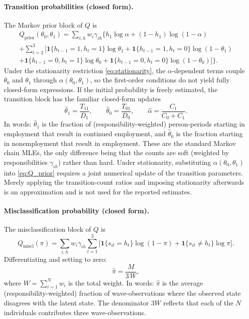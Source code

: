 \paragraph{Transition probabilities (closed form).}
The Markov prior block of \(Q\) is
\begin{multline}
Q_{\text{prior}}(\theta_0, \theta_1) =
\sum_{i, h} w_i \gamma_{ih} \bigg\{
  h_1 \log\alpha + (1 - h_1)\log(1 - \alpha) \\
  + \sum_{t=2}^{3} \Big[
    \mathbf{1}\{h_{t-1}{=}1, h_t{=}1\}\log\theta_1
    + \mathbf{1}\{h_{t-1}{=}1, h_t{=}0\}\log(1 - \theta_1) \\
    + \mathbf{1}\{h_{t-1}{=}0, h_t{=}1\}\log\theta_0
    + \mathbf{1}\{h_{t-1}{=}0, h_t{=}0\}\log(1 - \theta_0)
  \Big]
\bigg\}.
\label{eq:Q_prior}
\end{multline}
Under the stationarity restriction \eqref{eq:stationarity}, the
\(\alpha\)-dependent terms couple \(\theta_0\) and \(\theta_1\) through
\(\alpha(\theta_0, \theta_1)\), so the first-order conditions do not
yield fully closed-form expressions. If the initial probability is freely
estimated, the transition block has the familiar closed-form updates
\begin{equation}
\hat{\theta}_1 = \frac{T_{11}}{D_1}, \qquad
\hat{\theta}_0 = \frac{T_{01}}{D_0}, \qquad
\hat{\alpha} = \frac{C_1}{C_0+C_1}.
\label{eq:mstep_theta}
\end{equation}
In words: \(\hat{\theta}_1\) is the fraction of
(responsibility-weighted) person-periods starting in employment that
result in continued employment, and \(\hat{\theta}_0\) is the fraction
starting in nonemployment that result in employment. These are the
standard Markov chain MLEs, the only difference being that the counts
are soft (weighted by responsibilities \(\gamma_{ih}\)) rather than hard.
Under stationarity, substituting
\(\alpha(\theta_0,\theta_1)\) into \eqref{eq:Q_prior} requires a joint
numerical update of the transition parameters. Merely applying the
transition-count ratios and imposing stationarity afterwards is an
approximation and is not used for the reported estimates.

\paragraph{Misclassification probability (closed form).}
The misclassification block of \(Q\) is
\[
Q_{\text{miscl}}(\pi) = \sum_{i, h} w_i \gamma_{ih}
\sum_{t=1}^{3} \Big[
  \mathbf{1}\{s_{it} = h_t\}\log(1 - \pi)
  + \mathbf{1}\{s_{it} \neq h_t\}\log\pi
\Big].
\]
Differentiating and setting to zero:
\begin{equation}
\hat{\pi} = \frac{M}{3\,W},
\label{eq:mstep_pi}
\end{equation}
where \(W = \sum_{i=1}^{N} w_i\) is the total weight. In words:
\(\hat{\pi}\) is the average (responsibility-weighted) fraction of
wave-observations where the observed state disagrees with the latent
state. The denominator \(3W\) reflects that each of the \(N\) individuals
contributes three wave-observations.

